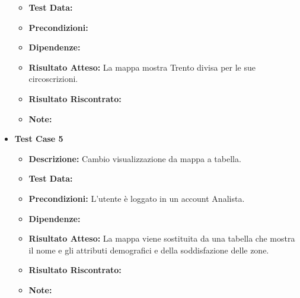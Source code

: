 \begin{itemize}
\begin{itemize}
                    \item \textbf{Test Data:}
                    \item \textbf{Precondizioni:} 
                    \item \textbf{Dipendenze:}
                    \item \textbf{Risultato Atteso:} La mappa mostra Trento divisa per le sue circoscrizioni.
                    \item \textbf{Risultato Riscontrato:}
                    \item \textbf{Note:}
                \end{itemize}
            \item \textbf{Test Case 5}
                \begin{itemize}
                    \item \textbf{Descrizione:} Cambio visualizzazione da mappa a tabella.
                    \item \textbf{Test Data:}
                    \item \textbf{Precondizioni:} L'utente è loggato in un account Analista.
                    \item \textbf{Dipendenze:}
                    \item \textbf{Risultato Atteso:} La mappa viene sostituita da una tabella che mostra il nome e gli attributi demografici e della soddisfazione delle zone.
                    \item \textbf{Risultato Riscontrato:}
                    \item \textbf{Note:}
                \end{itemize}
        \end{itemize}


